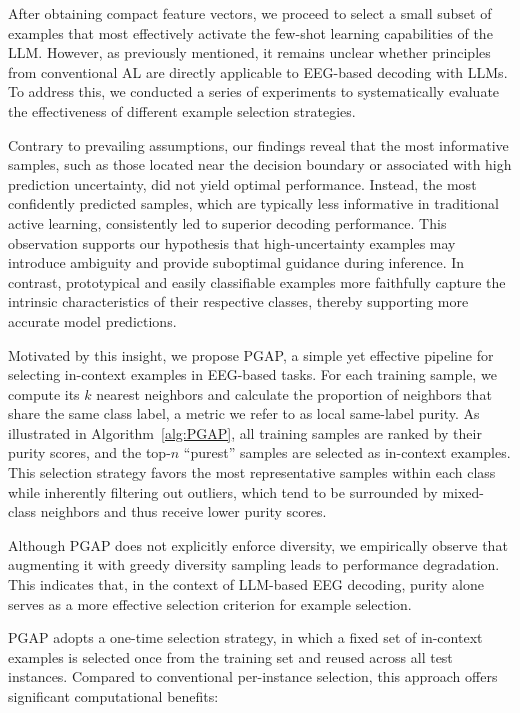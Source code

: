 \documentclass[journal,twocolumn]{IEEEtran}
\begin{document}
After obtaining compact feature vectors, we proceed to select a small subset of examples that most effectively activate the few-shot learning capabilities of the LLM. However, as previously mentioned, it remains unclear whether principles from conventional AL are directly applicable to EEG-based decoding with LLMs. To address this, we conducted a series of experiments to systematically evaluate the effectiveness of different example selection strategies.

Contrary to prevailing assumptions, our findings reveal that the most informative samples, such as those located near the decision boundary or associated with high prediction uncertainty, did not yield optimal performance. Instead, the most confidently predicted samples, which are typically less informative in traditional active learning, consistently led to superior decoding performance. This observation supports our hypothesis that high-uncertainty examples may introduce ambiguity and provide suboptimal guidance during inference. In contrast, prototypical and easily classifiable examples more faithfully capture the intrinsic characteristics of their respective classes, thereby supporting more accurate model predictions.

Motivated by this insight, we propose PGAP, a simple yet effective pipeline for selecting in-context examples in EEG-based tasks. For each training sample, we compute its $k$ nearest neighbors and calculate the proportion of neighbors that share the same class label, a metric we refer to as local same-label purity. As illustrated in Algorithm~\ref{alg:PGAP}, all training samples are ranked by their purity scores, and the top-$n$ “purest” samples are selected as in-context examples. This selection strategy favors the most representative samples within each class while inherently filtering out outliers, which tend to be surrounded by mixed-class neighbors and thus receive lower purity scores.

Although PGAP does not explicitly enforce diversity, we empirically observe that augmenting it with greedy diversity sampling leads to performance degradation. This indicates that, in the context of LLM-based EEG decoding, purity alone serves as a more effective selection criterion for example selection.

PGAP adopts a one-time selection strategy, in which a fixed set of in-context examples is selected once from the training set and reused across all test instances. Compared to conventional per-instance selection, this approach offers significant computational benefits:
\end{document}
